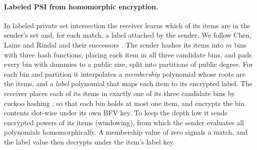 \documentclass[10pt]{article}
\begin{document}
\paragraph{Labeled PSI from homomorphic encryption.} In labeled private set intersection the receiver learns which of its items are in the sender's set and, for each match, a label attached by the sender. We follow Chen, Laine and Rindal and their successors \cite{clr17,chlr18,cmg21}. The sender hashes its items into $m$ bins with three hash functions, placing each item in all three candidate bins, and pads every bin with dummies to a public size, split into partitions of public degree. For each bin and partition it interpolates a \emph{membership} polynomial whose roots are the items, and a \emph{label} polynomial that maps each item to its encrypted label. The receiver places each of its items in exactly one of its three candidate bins by cuckoo hashing \cite{pr04}, so that each bin holds at most one item, and encrypts the bin contents slot-wise under its own BFV key. To keep the depth low it sends encrypted powers of its items (windowing), from which the sender evaluates all polynomials homomorphically. A membership value of zero signals a match, and the label value then decrypts under the item's label key.
\end{document}
